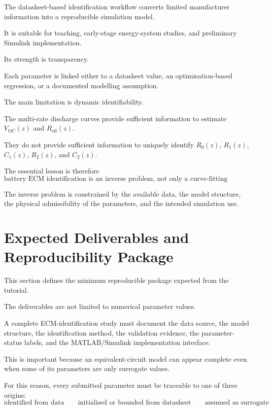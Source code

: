 \documentclass[a4paper,12pt]{article}
\begin{document}
The datasheet-based identification workflow converts limited manufacturer information into a reproducible simulation model.

It is suitable for teaching, early-stage energy-system studies, and preliminary Simulink implementation.

Its strength is transparency.

Each parameter is linked either to a datasheet value, an optimisation-based regression, or a documented modelling assumption.

The main limitation is dynamic identifiability.

The multi-rate discharge curves provide sufficient information to estimate \(V_{\mathrm{OC}}(z)\) and \(R_{\mathrm{eff}}(z)\).

They do not provide sufficient information to uniquely identify \(R_0(z)\), \(R_1(z)\), \(C_1(z)\), \(R_2(z)\), and \(C_2(z)\).

The essential lesson is therefore
\begin{equation}
\boxed{
\text{battery ECM identification is an inverse problem, not only a curve-fitting exercise.}
}
\label{eq:method_final_lesson}
\end{equation}

The inverse problem is constrained by the available data, the model structure, the physical admissibility of the parameters, and the intended simulation use.

\clearpage
\newpage

\section{Expected Deliverables and Reproducibility Package}
\label{sec:expected_deliverables}

This section defines the minimum reproducible package expected from the tutorial.

The deliverables are not limited to numerical parameter values.

A complete ECM-identification study must document the data source, the model structure, the identification method, the validation evidence, the parameter-status labels, and the MATLAB/Simulink implementation interface.

This is important because an equivalent-circuit model can appear complete even when some of its parameters are only surrogate values.

For this reason, every submitted parameter must be traceable to one of three origins:
\begin{equation}
\boxed{
\text{identified from data}
\qquad
\text{initialised or bounded from datasheet}
\qquad
\text{assumed as surrogate}
}
\label{eq:deliverables_parameter_origin}
\end{equation}
\end{document}
